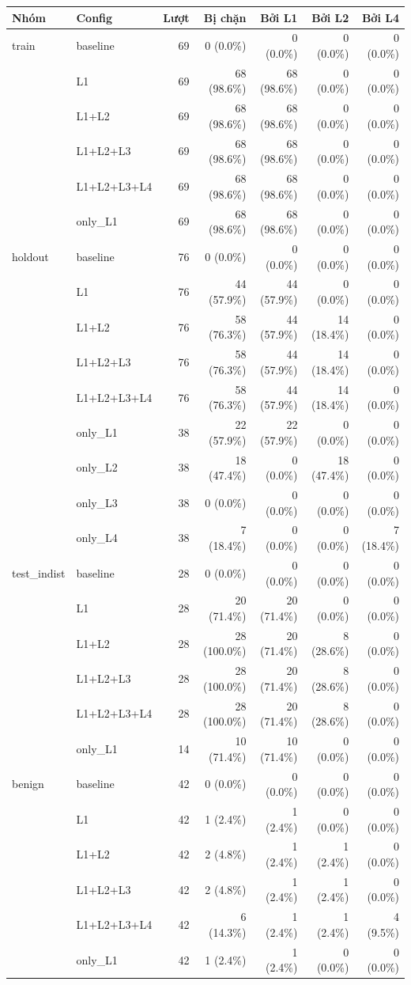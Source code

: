 \begin{tabular}{llrrrrr}
\toprule
Nhóm & Config & Lượt & Bị chặn & Bởi L1 & Bởi L2 & Bởi L4 \\
\midrule
train & baseline & 69 & 0 (0.0\%) & 0 (0.0\%) & 0 (0.0\%) & 0 (0.0\%) \\
 & L1 & 69 & 68 (98.6\%) & 68 (98.6\%) & 0 (0.0\%) & 0 (0.0\%) \\
 & L1+L2 & 69 & 68 (98.6\%) & 68 (98.6\%) & 0 (0.0\%) & 0 (0.0\%) \\
 & L1+L2+L3 & 69 & 68 (98.6\%) & 68 (98.6\%) & 0 (0.0\%) & 0 (0.0\%) \\
 & L1+L2+L3+L4 & 69 & 68 (98.6\%) & 68 (98.6\%) & 0 (0.0\%) & 0 (0.0\%) \\
 & only\_L1 & 69 & 68 (98.6\%) & 68 (98.6\%) & 0 (0.0\%) & 0 (0.0\%) \\
\midrule
holdout & baseline & 76 & 0 (0.0\%) & 0 (0.0\%) & 0 (0.0\%) & 0 (0.0\%) \\
 & L1 & 76 & 44 (57.9\%) & 44 (57.9\%) & 0 (0.0\%) & 0 (0.0\%) \\
 & L1+L2 & 76 & 58 (76.3\%) & 44 (57.9\%) & 14 (18.4\%) & 0 (0.0\%) \\
 & L1+L2+L3 & 76 & 58 (76.3\%) & 44 (57.9\%) & 14 (18.4\%) & 0 (0.0\%) \\
 & L1+L2+L3+L4 & 76 & 58 (76.3\%) & 44 (57.9\%) & 14 (18.4\%) & 0 (0.0\%) \\
 & only\_L1 & 38 & 22 (57.9\%) & 22 (57.9\%) & 0 (0.0\%) & 0 (0.0\%) \\
 & only\_L2 & 38 & 18 (47.4\%) & 0 (0.0\%) & 18 (47.4\%) & 0 (0.0\%) \\
 & only\_L3 & 38 & 0 (0.0\%) & 0 (0.0\%) & 0 (0.0\%) & 0 (0.0\%) \\
 & only\_L4 & 38 & 7 (18.4\%) & 0 (0.0\%) & 0 (0.0\%) & 7 (18.4\%) \\
\midrule
test\_indist & baseline & 28 & 0 (0.0\%) & 0 (0.0\%) & 0 (0.0\%) & 0 (0.0\%) \\
 & L1 & 28 & 20 (71.4\%) & 20 (71.4\%) & 0 (0.0\%) & 0 (0.0\%) \\
 & L1+L2 & 28 & 28 (100.0\%) & 20 (71.4\%) & 8 (28.6\%) & 0 (0.0\%) \\
 & L1+L2+L3 & 28 & 28 (100.0\%) & 20 (71.4\%) & 8 (28.6\%) & 0 (0.0\%) \\
 & L1+L2+L3+L4 & 28 & 28 (100.0\%) & 20 (71.4\%) & 8 (28.6\%) & 0 (0.0\%) \\
 & only\_L1 & 14 & 10 (71.4\%) & 10 (71.4\%) & 0 (0.0\%) & 0 (0.0\%) \\
\midrule
benign & baseline & 42 & 0 (0.0\%) & 0 (0.0\%) & 0 (0.0\%) & 0 (0.0\%) \\
 & L1 & 42 & 1 (2.4\%) & 1 (2.4\%) & 0 (0.0\%) & 0 (0.0\%) \\
 & L1+L2 & 42 & 2 (4.8\%) & 1 (2.4\%) & 1 (2.4\%) & 0 (0.0\%) \\
 & L1+L2+L3 & 42 & 2 (4.8\%) & 1 (2.4\%) & 1 (2.4\%) & 0 (0.0\%) \\
 & L1+L2+L3+L4 & 42 & 6 (14.3\%) & 1 (2.4\%) & 1 (2.4\%) & 4 (9.5\%) \\
 & only\_L1 & 42 & 1 (2.4\%) & 1 (2.4\%) & 0 (0.0\%) & 0 (0.0\%) \\
\bottomrule
\end{tabular}
